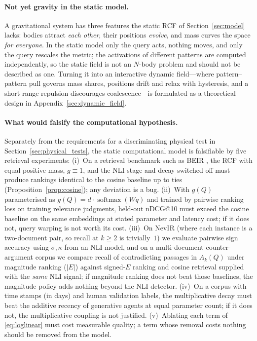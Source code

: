 \documentclass[11pt]{article}
\theoremstyle{remark}
\newcommand{\act}{E}
\begin{document}
\paragraph{Not yet gravity in the static model.}
A gravitational system has three features the static RCF of Section~\ref{sec:model} lacks: bodies attract \emph{each other}, their positions \emph{evolve}, and mass curves the space \emph{for everyone}. In the static model only the query acts, nothing moves, and only the query rescales the metric; the activations of different patterns are computed independently, so the static field is not an $N$-body problem and should not be described as one. Turning it into an interactive dynamic field---where pattern--pattern pull governs mass shares, positions drift and relax with hysteresis, and a short-range repulsion discourages coalescence---is formulated as a theoretical design in Appendix~\ref{sec:dynamic_field}.

\paragraph{What would falsify the computational hypothesis.}
Separately from the requirements for a discriminating physical test in Section~\ref{sec:physical_tests}, the static computational model is falsifiable by five retrieval experiments: (i)~On a retrieval benchmark such as BEIR \citep{thakur2021beir}, the RCF with equal positive mass, $g\equiv 1$, and the NLI stage and decay switched off must produce rankings identical to the cosine baseline up to ties (Proposition~\ref{prop:cosine}); any deviation is a bug. (ii)~With $g(Q)$ parameterised as $g(Q)=d\cdot\operatorname{softmax}(Wq)$ and trained by pairwise ranking loss on training relevance judgments, held-out nDCG@10 must exceed the cosine baseline on the same embeddings at stated parameter and latency cost; if it does not, query warping is not worth its cost. (iii)~On NevIR \citep{weller2024nevir} (where each instance is a two-document pair, so recall at $k\ge 2$ is trivially~$1$) we evaluate pairwise sign accuracy using $\sigma,\kappa$ from an NLI model, and on a multi-document counter-argument corpus \citep{wachsmuth2018retrieval} we compare recall of contradicting passages in $A_k(Q)$ under magnitude ranking ($|\act|$) against signed-$\act$ ranking and cosine retrieval supplied with the \emph{same} NLI signal; if magnitude ranking does not beat those baselines, the magnitude policy adds nothing beyond the NLI detector. (iv)~On a corpus with time stamps (in days) and human validation labels, the multiplicative decay must beat the additive recency of generative agents at equal parameter count; if it does not, the multiplicative coupling is not justified. (v)~Ablating each term of \eqref{eq:loglinear} must cost measurable quality; a term whose removal costs nothing should be removed from the model.
\end{document}
